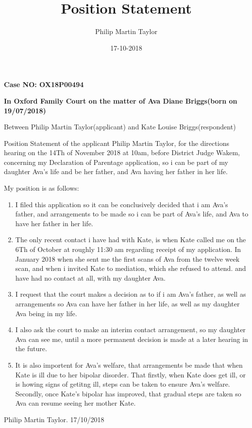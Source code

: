 \documentclass[10pt,a4paper]{book}
\date{17-10-2018}
\author{Philip Martin Taylor}
\title{Position Statement}
\begin{document}
 
\begin{flushright} 
  \textbf{Case NO: OX18P00494}
\end{flushright}
\begin{flushright}
  \textbf{In Oxford Family Court on the matter of Ava Diane Briggs(born on 19/07/2018)}
\end{flushright} 
\begin{flushleft}
  Between Philip Martin Taylor(applicant) and Kate Louise Briggs(respondent)
\end{flushleft} 
\begin{flushleft}
  Position Statement of the applicant Philip Martin Taylor, for the directions hearing on the 14Th of November 2018 at 10am, before District Judge Wakem, concerning my Declaration of Parentage application, so i can be part of my daughter Ava's life and be her father, and Ava having her father in her life.
\end{flushleft}
\begin{flushleft}
  My position is as follows:
\end{flushleft}
\begin{enumerate}
  \item I filed this application so it can be conclusively decided that i am Ava's father, and arrangements to be made so i can be part of Ava's life, and Ava to have her father in her life.
  \item The only recent contact i have had with Kate, is when Kate called me on the 6Th of October at roughly 11:30 am regarding receipt of my application. In January 2018 when she sent me the first scans of Ava from the twelve week scan, and when i invited Kate to mediation, which she refused to attend. and have had no contact at all, with my daughter Ava.
  \item I request that the court makes a decision as to if i am Ava's father, as well as arrangements so Ava can have her father in her life, as well as my daughter Ava being in my life.
  \item I also ask the court to make an interim contact arrangement, so my daughter Ava can see me, until a more permanent decision is made at a later hearing in the future.
    \item It is also importent for Ava's welfare, that arrangements be made that when Kate is ill due to her bipolar disorder. That firstly, when Kate does get ill, or is howing signs of getitng ill, steps can be taken to ensure Ava's welfare. Secondly, once Kate's bipolar has improved, that gradual steps are taken so Ava can resume seeing her mother Kate.
\end{enumerate}
\begin{center}
  Philip Martin Taylor. 17/10/2018
\end{center}
\end{document}
